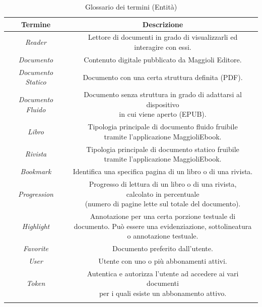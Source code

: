 \begin{longtable}{|c|c|}
         \hline
         \textbf{Termine} & \textbf{Descrizione}\\
         \hline
         \textit{Reader} & \specialcell{Lettore di documenti in grado di visualizzarli ed \\interagire con essi.}\\
         \hline
         \textit{Documento} & Contenuto digitale pubblicato da Maggioli Editore.\\
         \hline
         \textit{Documento Statico} & Documento con una certa struttura definita (PDF).\\
         \hline
         \textit{Documento Fluido} & \specialcell{Documento senza struttura in grado di adattarsi al dispositivo\\ in cui viene aperto (EPUB).}\\
         \hline
         \textit{Libro} & \specialcell{Tipologia principale di documento fluido fruibile\\ tramite l'applicazione MaggioliEbook.}\\
         \hline
         \textit{Rivista} & \specialcell{Tipologia principale di documento statico fruibile\\ tramite l'applicazione MaggioliEbook.}\\
         \hline
         \textit{Bookmark} & Identifica una specifica pagina di un libro o di una rivista.\\
         \hline
         \textit{Progression} & \specialcell{Progresso di lettura di un libro o di una rivista,\\ calcolato in percentuale \\(numero di pagine lette sul totale del documento).}\\
         \hline
         \textit{Highlight} & \specialcell{Annotazione per una certa porzione testuale di \\documento. Può essere una evidenziazione, sottolineatura \\o annotazione testuale.}\\
         \hline
         \textit{Favorite} &  Documento preferito dall'utente.\\
         \hline
         \textit{User} & Utente con uno o più abbonamenti attivi.\\
         \hline
          \textit{Token} & \specialcell{Autentica e autorizza l'utente ad accedere ai vari documenti\\ per i quali esiste un abbonamento attivo.}\\
         \hline
    \caption{Glossario dei termini (Entità)}
\end{longtable}

